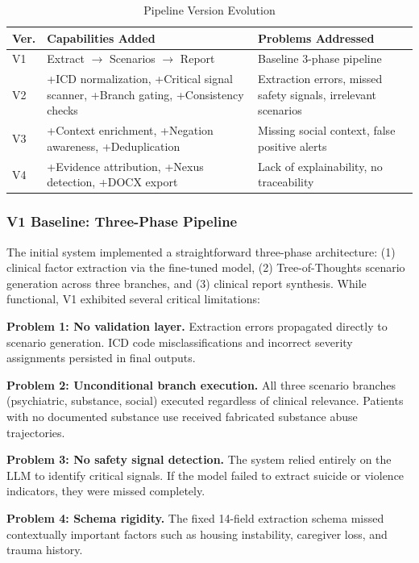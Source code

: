 \documentclass[conference]{IEEEtran}
\begin{document}
\begin{table}[h]
\caption{Pipeline Version Evolution}
\label{tab:evolution}
\centering
\small
\begin{tabular}{@{}p{0.6cm}p{3.4cm}p{3.2cm}@{}}
\toprule
\textbf{Ver.} & \textbf{Capabilities Added} & \textbf{Problems Addressed} \\
\midrule
V1 & Extract $\rightarrow$ Scenarios $\rightarrow$ Report & Baseline 3-phase pipeline \\
\midrule
V2 & +ICD normalization, +Critical signal scanner, +Branch gating, +Consistency checks & Extraction errors, missed safety signals, irrelevant scenarios \\
\midrule
V3 & +Context enrichment, +Negation awareness, +Deduplication & Missing social context, false positive alerts \\
\midrule
V4 & +Evidence attribution, +Nexus detection, +DOCX export & Lack of explainability, no traceability \\
\bottomrule
\end{tabular}
\end{table}

\subsubsection{V1 Baseline: Three-Phase Pipeline}

The initial system implemented a straightforward three-phase architecture: (1) clinical factor extraction via the fine-tuned model, (2) Tree-of-Thoughts scenario generation across three branches, and (3) clinical report synthesis. While functional, V1 exhibited several critical limitations:

\textbf{Problem 1: No validation layer.} Extraction errors propagated directly to scenario generation. ICD code misclassifications and incorrect severity assignments persisted in final outputs.

\textbf{Problem 2: Unconditional branch execution.} All three scenario branches (psychiatric, substance, social) executed regardless of clinical relevance. Patients with no documented substance use received fabricated substance abuse trajectories.

\textbf{Problem 3: No safety signal detection.} The system relied entirely on the LLM to identify critical signals. If the model failed to extract suicide or violence indicators, they were missed completely.

\textbf{Problem 4: Schema rigidity.} The fixed 14-field extraction schema missed contextually important factors such as housing instability, caregiver loss, and trauma history.
\end{document}
